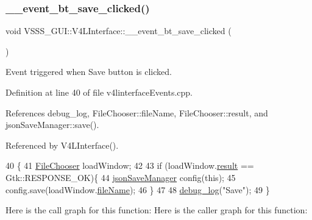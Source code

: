 \subsubsection{\texorpdfstring{\+\_\+\+\_\+event\+\_\+bt\+\_\+save\+\_\+clicked()}{\_\_event\_bt\_save\_clicked()}}
{\footnotesize\ttfamily void V\+S\+S\+S\+\_\+\+G\+U\+I\+::\+V4\+L\+Interface\+::\+\_\+\+\_\+event\+\_\+bt\+\_\+save\+\_\+clicked (\begin{DoxyParamCaption}{ }\end{DoxyParamCaption})}



Event triggered when \textquotesingle{}Save\textquotesingle{} button is clicked. 



Definition at line 40 of file v4linterface\+Events.\+cpp.



References debug\+\_\+log, File\+Chooser\+::file\+Name, File\+Chooser\+::result, and json\+Save\+Manager\+::save().



Referenced by V4\+L\+Interface().


\begin{DoxyCode}
40                                                \{
41         \hyperlink{class_file_chooser}{FileChooser} loadWindow;
42 
43         \textcolor{keywordflow}{if} (loadWindow.\hyperlink{class_file_chooser_a7651bd1362ed109c0ac323d8ab41b254}{result} == Gtk::RESPONSE\_OK)\{
44             \hyperlink{classjson_save_manager}{jsonSaveManager} config(\textcolor{keyword}{this});
45             config.save(loadWindow.\hyperlink{class_file_chooser_a1d086cbbd2700e5fe9e143c505b205c8}{fileName});
46         \}
47 
48         \hyperlink{debug_8hpp_afde3f42696113719c9ae35507125ee6e}{debug\_log}(\textcolor{stringliteral}{"Save"});
49     \}
\end{DoxyCode}
Here is the call graph for this function\+:
Here is the caller graph for this function\+:
\mbox{\label{class_v_s_s_s___g_u_i_1_1_v4_l_interface_ac83a8f5a54baf09ade5e3ec24ba91082}} 

